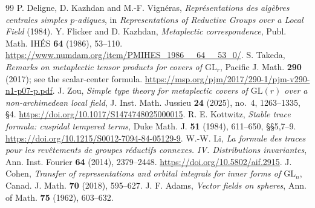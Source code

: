 \documentclass[11pt]{article}
\theoremstyle{plain}
\theoremstyle{definition}
\begin{document}
\begin{thebibliography}{99}
 P. Deligne, D. Kazhdan and M.-F. Vign\'eras,
\emph{Repr\'esentations des alg\`ebres centrales simples $p$-adiques},
in \emph{Representations of Reductive Groups over a Local Field} (1984).
 Y. Flicker and D. Kazhdan,
\emph{Metaplectic correspondence}, Publ. Math. IH\'ES \textbf{64}
(1986), 53--110.
\url{https://www.numdam.org/item/PMIHES_1986__64__53_0/}.
 S. Takeda, \emph{Remarks on metaplectic tensor products for covers of $\mathrm{GL}_r$},
Pacific J. Math. \textbf{290} (2017); see the scalar-center formula.
\url{https://msp.org/pjm/2017/290-1/pjm-v290-n1-p07-p.pdf}.
 J. Zou, \emph{Simple type theory for metaplectic
covers of $\mathrm{GL}(r)$ over a non-archimedean local field},
J. Inst. Math. Jussieu \textbf{24} (2025), no.~4, 1263--1335, \S4.
\url{https://doi.org/10.1017/S1474748025000015}.
 R. E. Kottwitz, \emph{Stable trace formula:
cuspidal tempered terms}, Duke Math. J. \textbf{51} (1984),
611--650, \S\S5,7--9.
\url{https://doi.org/10.1215/S0012-7094-84-05129-9}.
 W.-W. Li, \emph{La formule des traces pour les rev\^etements
de groupes r\'eductifs connexes. IV. Distributions invariantes},
Ann. Inst. Fourier \textbf{64} (2014), 2379--2448.
\url{https://doi.org/10.5802/aif.2915}.
 J. Cohen, \emph{Transfer of representations and
orbital integrals for inner forms of $\mathrm{GL}_n$},
Canad. J. Math. \textbf{70} (2018), 595--627.
 J. F. Adams, \emph{Vector fields on spheres},
Ann. of Math. \textbf{75} (1962), 603--632.
\end{thebibliography}
\end{document}

